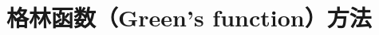 \documentclass[12pt,a4paper]{article}
\renewcommand{\[}{\ $\displaystyle}
\renewcommand{\]}{$\ }%
\newcommand\mi{\mathrm{i}}
\newcommand\e{\mathrm{e}}
\begin{document}
\begin{enumerate}
\begin{eqnarray*}
	  		\end{eqnarray*}
	  \end{enumerate}
	
\section{格林函数（Green's function）方法}
\end{document}
